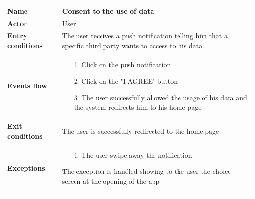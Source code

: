 \begin{table}[]
\begin{adjustbox}{width=\textwidth}
\footnotesize
\begin{tabular}{|p{}|p{}|}
\hline
\textbf{Name}             &  Consent to the use of data\\ \hline
\textbf{Actor}            &  User\\ \hline
\textbf{Entry conditions} &  The user receives a push notification telling him that a specific third party wants to access to his data\\ \hline
\textbf{Events flow}      &
	\begin{itemize}
		\item[1.] Click on the push notification
		\item[2.] Click on the "I AGREE" button
		\item[3.] The user successfully allowed the usage of his data and the system redirects him to his home page
	\end{itemize}\\ \hline
\textbf{Exit conditions}  &  The user is successfully redirected to the home page\\ \hline
\textbf{Exceptions}       &
	\begin{itemize}
		\item[1.] The user swipe away the notification
	\end{itemize}
	The exception is handled showing to the user the choice screen at the opening of the app\\ \hline
\end{tabular}
\end{adjustbox}
\end{table}

